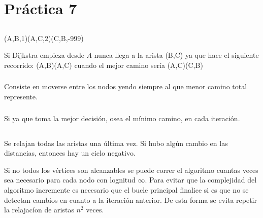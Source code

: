 \section{Práctica 7}

\setcounter{subsection}{1}
\subsection{}

\subsubsection{}
(A,B,1)(A,C,2)(C,B,-999)

Si Dijkstra empieza desde $A$ nunca llega a la arista (B,C) ya que hace el siguiente recorrido: (A,B)(A,C) cuando el mejor camino sería (A,C)(C,B)

\subsubsection{}
Consiste en moverse entre los nodos yendo siempre al que menor camino total represente.

\subsubsection{}
Si ya que toma la mejor decisión, osea el mínimo camino, en cada iteración.

\setcounter{subsection}{4}
\subsection{}

\subsubsection{}
Se relajan todas las aristas una última vez. Si hubo algún cambio en las distancias, entonces hay un ciclo negativo.

Si no todos los vértices son alcanzables se puede correr el algoritmo cuantas veces sea necesario para cada nodo con lognitud $\infty$. Para evitar que la complejidad del algoritmo incremente es necesario que el bucle principal finalice si es que no se detectan cambios en cuanto a la iteración anterior. De esta forma se evita repetir la relajacíon de aristas $n^2$ veces.
